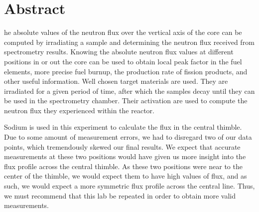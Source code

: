 %
%
%

\chapter*{Abstract}
\begin{SingleSpace}
he absolute values of the neutron flux over the vertical axis of the core can be computed by irradiating a sample and determining the neutron flux received from spectrometry results. Knowing the absolute neutron flux values at different positions in or out the core can be used to obtain local peak factor in the fuel elements, more precise fuel burnup, the production rate of fission products, and other useful information. Well chosen target materials are used. They are irradiated for a given period of time, after which the samples decay until they can be used in the spectrometry chamber. Their activation are used to compute the neutron flux they experienced within the reactor.

Sodium is used in this experiment to calculate the flux in the central thimble. Due to some amount of measurement errors, we had to disregard two of our data points, which tremendously skewed our final results. We expect that accurate measurements at these two positions would have given us more insight into the flux profile across the central thimble. As these two positions were near to the center of the thimble, we would expect them to have high values of flux, and as such, we would expect a more symmetric flux profile across the central line. Thus, we must recommend that this lab be repeated in order to obtain more valid measurements.

\end{SingleSpace}
\clearpage
